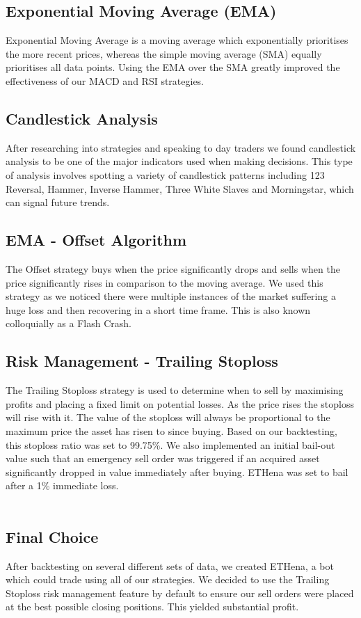 \documentclass[12pt]{article}
\begin{document}
\begin{multicols}{2}
    \subsection{Exponential Moving Average (EMA)}
    Exponential Moving Average is a moving average which exponentially prioritises the more recent prices, whereas the simple moving average (SMA) equally prioritises all data points. Using the EMA over the SMA greatly improved the effectiveness of our MACD and RSI strategies.

    \subsection{Candlestick Analysis}
    After researching into strategies and speaking to day traders we found candlestick analysis to be one of the major indicators used when making decisions. This type of analysis involves spotting a variety of candlestick patterns including 123 Reversal, Hammer, Inverse Hammer, Three White Slaves and Morningstar, which can signal future trends.
    \subsection{EMA - Offset Algorithm}
    The Offset strategy buys when the price significantly drops and sells when the price significantly rises in comparison to the moving average. We used this strategy as we noticed there were multiple instances of the market suffering a huge loss and then recovering in a short time frame. This is also known colloquially as a Flash Crash.

    \subsection{Risk Management - Trailing Stoploss}
    The Trailing Stoploss strategy is used to determine when to sell by maximising profits and placing a fixed limit on potential losses. As the price rises the stoploss will rise with it. The value of the stoploss will always be proportional to the maximum price the asset has risen to since buying. Based on our backtesting, this stoploss ratio was set to 99.75\%. We also implemented an initial bail-out value such that an emergency sell order was triggered if an acquired asset significantly dropped in value immediately after buying. ETHena was set to bail after a 1\% immediate loss.\\\\
    \subsection{Final Choice}
    After backtesting on several different sets of data, we created ETHena, a bot which could trade using all of our strategies. We decided to use the Trailing Stoploss risk management feature by default to ensure our sell orders were placed at the best possible closing positions. This yielded substantial profit.

\end{multicols}
\end{document}
